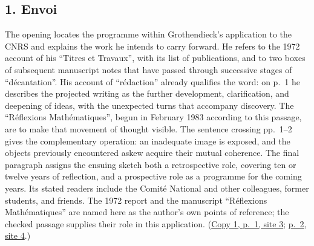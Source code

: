 \documentclass[11pt,a4paper]{article}
\begin{document}
\subsection*{1. Envoi}
The opening locates the programme within Grothendieck's application to the
CNRS and explains the work he intends to carry forward. He refers to the
1972 account of his ``Titres et Travaux'', with its list of publications,
and to two boxes of subsequent manuscript notes that have passed through
successive stages of ``décantation''. His account of ``rédaction'' already
qualifies the word: on p.~1 he describes the projected writing as the
further development, clarification, and deepening of ideas, with the
unexpected turns that accompany discovery. The ``Réflexions Mathématiques'',
begun in February 1983 according to this passage, are to make that movement
of thought visible. The sentence crossing pp.~1--2 gives the complementary
operation: an inadequate image is exposed, and the objects previously
encountered askew acquire their mutual coherence. The final paragraph
assigns the ensuing sketch both a retrospective role, covering ten or
twelve years of reflection, and a prospective role as a programme for the
coming years. Its stated readers include the Comité National and other
colleagues, former students, and friends. The 1972 report and the manuscript
``Réflexions Mathématiques'' are named here as the author's own points of
reference; the checked passage supplies their role in this application.
(\href{https://grothendieck.umontpellier.fr/web/viewer.html?file=../119.pdf\#page=4}{Copy 1, p.~1, site 3};
\href{https://grothendieck.umontpellier.fr/web/viewer.html?file=../119.pdf\#page=5}{p.~2, site 4}.)
\end{document}
